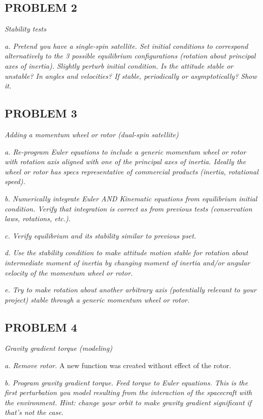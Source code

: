 \subsection{PROBLEM 2}
\textit{Stability tests}

\textit{a. Pretend you have a single-spin satellite. Set initial conditions to correspond alternatively to the 3 possible equilibrium configurations (rotation about principal axes of inertia). Slightly perturb initial condition. Is the attitude stable or unstable? In angles and velocities? If stable, periodically or asymptotically? Show it.}

\subsection{PROBLEM 3}
\textit{Adding a momentum wheel or rotor (dual-spin satellite)}

\textit{a. Re-program Euler equations to include a generic momentum wheel or rotor with rotation axis aligned with one of the principal axes of inertia. Ideally the wheel or rotor has specs representative of commercial products (inertia, rotational speed).}

\textit{b. Numerically integrate Euler AND Kinematic equations from equilibrium initial condition. Verify that integration is correct as from previous tests (conservation laws, rotations, etc.).}

\textit{c. Verify equilibrium and its stability similar to previous pset.}

\textit{d. Use the stability condition to make attitude motion stable for rotation about intermediate moment of inertia by changing moment of inertia and/or angular velocity of the momentum wheel or rotor.}

\textit{e. Try to make rotation about another arbitrary axis (potentially relevant to your project) stable through a generic momentum wheel or rotor.}

\subsection{PROBLEM 4}
\textit{Gravity gradient torque (modeling)}

\textit{a. Remove rotor.}
A new function was created without effect of the rotor.

\textit{b. Program gravity gradient torque. Feed torque to Euler equations. This is the first perturbation you model resulting from the interaction of the spacecraft with the environment. Hint: change your orbit to make gravity gradient significant if that’s not the case.}

